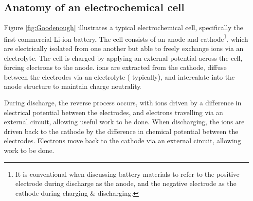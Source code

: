 \subsection{Anatomy of an electrochemical cell}
Figure \ref{fig:Goodenough} illustrates a typical electrochemical cell, specifically the first commercial Li-ion battery.
The cell consists of an anode and cathode\footnote{It is conventional when discussing battery materials to refer to the positive electrode during discharge as the anode, and the negative electrode as the cathode during charging \& discharging.},
which are electrically isolated from one another but able to freely exchange ions via an electrolyte.
The cell is charged by applying an external potential across the cell, forcing electrons to the anode.
 ions are extracted from the  cathode, diffuse between the electrodes via an electrolyte ( typically), and intercalate into the anode structure to maintain charge neutrality.

During discharge, the reverse process occurs, with  ions driven by a difference in electrical potential between the electrodes, and electrons travelling via an external circuit, allowing useful work to be done.
When discharging, the  ions are driven back to the cathode by the difference in chemical potential between the electrodes.
Electrons move back to the cathode via an external circuit, allowing work to be done.


